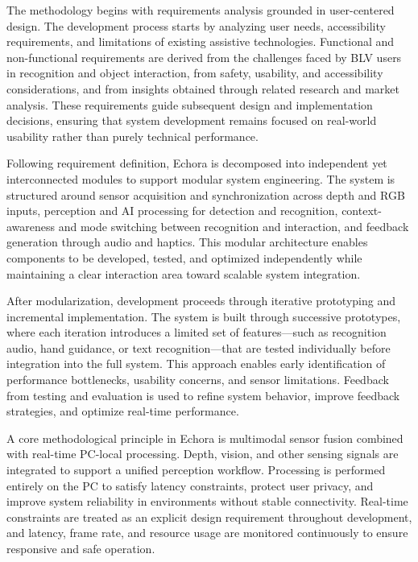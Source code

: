 The methodology begins with requirements analysis grounded in user-centered design. The development process starts by analyzing user needs, accessibility requirements, and limitations of existing assistive technologies. Functional and non-functional requirements are derived from the challenges faced by BLV users in recognition and object interaction, from safety, usability, and accessibility considerations, and from insights obtained through related research and market analysis. These requirements guide subsequent design and implementation decisions, ensuring that system development remains focused on real-world usability rather than purely technical performance.

Following requirement definition, Echora is decomposed into independent yet interconnected modules to support modular system engineering. The system is structured around sensor acquisition and synchronization across depth and RGB inputs, perception and AI processing for detection and recognition, context-awareness and mode switching between recognition and interaction, and feedback generation through audio and haptics. This modular architecture enables components to be developed, tested, and optimized independently while maintaining a clear interaction area toward scalable system integration.

After modularization, development proceeds through iterative prototyping and incremental implementation. The system is built through successive prototypes, where each iteration introduces a limited set of features---such as recognition audio, hand guidance, or text recognition---that are tested individually before integration into the full system. This approach enables early identification of performance bottlenecks, usability concerns, and sensor limitations. Feedback from testing and evaluation is used to refine system behavior, improve feedback strategies, and optimize real-time performance.

A core methodological principle in Echora is multimodal sensor fusion combined with real-time PC-local processing. Depth, vision, and other sensing signals are integrated to support a unified perception workflow. Processing is performed entirely on the PC to satisfy latency constraints, protect user privacy, and improve system reliability in environments without stable connectivity. Real-time constraints are treated as an explicit design requirement throughout development, and latency, frame rate, and resource usage are monitored continuously to ensure responsive and safe operation.

